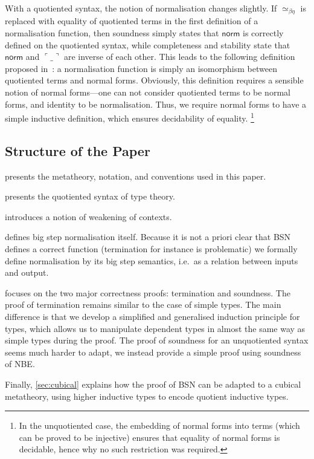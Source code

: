 \documentclass[a4paper,UKenglish,cleveref]{lipics-v2019}
\newcommand{\agdaSymb}[1]{\mathsf{#1}}
\newcommand{\norm}{\agdaSymb{norm}}
\newcommand{\cul}{\ulcorner}
\newcommand{\cur}{\urcorner}
\newcommand{\Beq}{\simeq_{\beta\eta}}
\begin{document}
With a quotiented syntax, the notion of normalisation changes slightly. If
$\Beq$ is replaced with equality of quotiented terms in the first definition
of a normalisation function, then soundness simply states that $\norm$ is
correctly defined on the quotiented syntax, while completeness and stability
state that $\norm$ and $\cul\_\cur$ are inverse of each other.  This leads to
the following definition proposed in~\cite{kaposi2016normalisation}: a
normalisation function is simply an isomorphism between quotiented terms and
normal forms. Obviously, this definition requires a sensible notion of normal
forms---one can not consider quotiented terms to be normal forms, and identity
to be normalisation. Thus, we require normal forms to have a simple inductive
definition, which ensures decidability of equality.%
\footnote{%
  In the unquotiented case, the embedding of normal forms into terms (which can
  be proved to be injective) ensures that equality of normal forms is decidable,
  hence why no such restriction was required.
}

\subsection{Structure of the Paper}
 presents the metatheory, notation, and conventions used in this paper.

 presents the quotiented syntax of type theory.

 introduces a notion of weakening of contexts.

 defines big step normalisation itself. Because
it is not a priori clear that BSN defines a correct function (termination for
instance is problematic) we formally define normalisation by its big step
semantics, i.e.\ as a relation between inputs and output.

 focuses on the two major correctness proofs:
termination and soundness. The proof of termination remains similar to the case
of simple types. The main difference is that we develop a simplified and
generalised induction principle for types, which allows us to manipulate
dependent types in almost the same way as simple types during the proof.
The proof of soundness for an unquotiented syntax seems much harder to
adapt, we instead provide a simple proof using soundness of NBE.

Finally, \cref{sec:cubical} explains how the proof of BSN can be
adapted to a cubical metatheory, using higher inductive types to encode
quotient inductive types.
\end{document}
